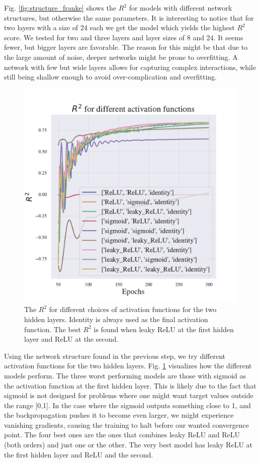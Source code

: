 Fig. \ref{fig:structure_franke} shows the $R^2$ for models with different network structures, but otherwise the same parameters. It is interesting to notice that for two layers with a size of 24 each we get the model which yields the highest $R^2$ score. We tested for two and three layers and layer sizes of 8 and 24. 
It seems fewer, but bigger layers are favorable. 
The reason for this might be that due to the large amount of noise, deeper networks might be prone to overfitting.
A network with few but wide layers allows for capturing complex interactions, while still being shallow enough to avoid over-complication and overfitting.

\begin{figure}[h!]
    \centering
    \includegraphics[width=1.0\linewidth]{project_2/figures/$R^2$ for different activation functions_continuous.pdf}
    \caption{The $R^2$ for different choices of activation functions for the two hidden layers. Identity is always used as the final activation function. The best $R^2$ is found when leaky ReLU at the first hidden layer and ReLU at the second.}
    \label{fig:activation_franke}
\end{figure}

Using the network structure found in the previous step, we try different activation functions for the two hidden layers. 
Fig. \ref{fig:activation_franke} visualizes how the different models perform. 
The three worst performing models are those with sigmoid as the activation function at the first hidden layer. 
This is likely due to the fact that sigmoid is not designed for problems where one might want target values outside the range [0,1].
In the case where the sigmoid outputs something close to 1, and the backpropagation pushes it to become even larger, we might experience vanishing gradients, causing the training to halt before our wanted convergence point.
The four best ones are the ones that combines leaky ReLU and ReLU (both orders) and just one or the other. 
The very best model has leaky ReLU at the first hidden layer and ReLU and the second.

